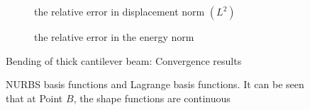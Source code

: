     \begin{figure}
        \begin{subfigure}[b]{1\linewidth}
            \centering
            \scalebox{0.7}{
                
            }
            \label{iso_fig:circular_hole_displacement_convergence}
            \caption{the relative error in displacement norm $(L^2)$}
        \end{subfigure}
        
        \begin{subfigure}[b]{1\linewidth}
            \centering
            \scalebox{0.7}{
                
            }
            \label{iso_fig:circular_hole_energy_convergence}
            \caption{the relative error in the energy norm}
        \end{subfigure}
    \caption{Bending of thick cantilever beam: Convergence results}
    \label{iso_fig:circular_hole_convergence}
    \end{figure}

    \begin{figure}
        \centering
        \caption{NURBS basis functions and Lagrange basis functions. It can be seen that at Point $B$, the shape functions are continuous}
        \label{iso_fig:circular_hole_basis}
    \end{figure}

